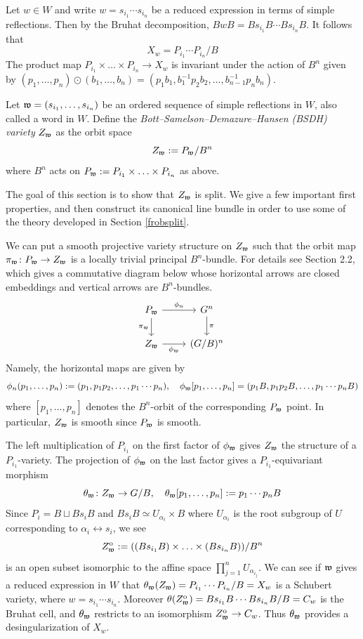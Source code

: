 \documentclass[12pt]{article}
\begin{document}
Let $w \in W$ and write $w = s_{i_1}\cdots s_{i_n}$ be a reduced expression in terms of simple reflections. Then by the Bruhat decomposition, $BwB = Bs_{i_1}B\cdots Bs_{i_n}B$. It follows that
\[X_w = P_{i_1}\cdots P_{i_n}/B\]
The product map $P_{i_1} \times \ldots \times P_{i_n} \to X_w$ is invariant under the action of $B^n$ given by $(p_1,\ldots,p_n) \odot (b_1,\ldots,b_n) = (p_1 b_1, b_1^{-1} p_2 b_2, \ldots, b_{n-1}^{-1} p_n b_n)$.
\begin{defn}
    Let $\mathfrak{w} = (s_{i_1},\ldots,s_{i_n})$ be an ordered sequence of simple reflections in $W$, also called a word in $W$. Define the \textit{Bott–Samelson–Demazure–Hansen (BSDH) variety} $Z_{\mathfrak{w}}$ as the orbit space
    \[Z_{\mathfrak{w}} := P_{\mathfrak{w}}/B^n\]
    where $B^n$ acts on $P_{\mathfrak{w}} := P_{i_1} \times \ldots \times P_{i_n}$ as above.
\end{defn}
The goal of this section is to show that $Z_{\mathfrak{w}}$ is split. We give a few important first properties, and then construct its canonical line bundle in order to use some of the theory developed in Section \ref{frobsplit}.

We can put a smooth projective variety structure on $Z_{\mathfrak{w}}$ such that the orbit map $\pi_{\mathfrak{w}} \colon P_{\mathfrak{w}} \to Z_{\mathfrak{w}}$ is a locally trivial principal $B^n$-bundle. For details see \cite{Brion2004} Section 2.2, which gives a commutative diagram below whose horizontal arrows are closed embeddings and vertical arrows are $B^n$-bundles.
\[\begin{tikzcd}
	{P_{\mathfrak{w}}} & {G^n} \\
	{Z_{\mathfrak{w}}} & {(G/B)^n}
	\arrow["{\phi_n}", from=1-1, to=1-2]
	\arrow["{\pi_{\mathfrak{w}}}"', from=1-1, to=2-1]
	\arrow["\pi", from=1-2, to=2-2]
	\arrow["{\phi_{\mathfrak{w}}}"', from=2-1, to=2-2]
\end{tikzcd}\]
Namely, the horizontal maps are given by
\[\phi_n(p_1,\ldots,p_n) := (p_1,p_1p_2,\ldots,p_1\cdots p_n), \quad \phi_{\mathfrak{w}}[p_1,\ldots,p_n]=(p_1B, p_1p_2B, \ldots, p_1\cdots p_n B)\]
where $[p_1,\ldots,p_n]$ denotes the $B^n$-orbit of the corresponding $P_{\mathfrak{w}}$ point. In particular, $Z_{\mathfrak{w}}$ is smooth since $P_{\mathfrak{w}}$ is smooth.

The left multiplication of $P_{i_1}$ on the first factor of $\phi_{\mathfrak{w}}$ gives $Z_{\mathfrak{w}}$ the structure of a $P_{i_1}$-variety. The projection of $\phi_{\mathfrak{w}}$ on the last factor gives a $P_{i_1}$-equivariant morphism 
\[\theta_{\mathfrak{w}} \colon Z_{\mathfrak{w}} \rightarrow G/B, \quad \theta_{\mathfrak{w}}[p_1,\ldots,p_n] := p_1\cdots p_n B\]
Since $P_i = B \sqcup Bs_i B$ and $Bs_i B \simeq U_{\alpha_i} \times B$ where $U_{\alpha_i}$ is the root subgroup of $U$ corresponding to $\alpha_i \leftrightarrow s_i$, we see
\[Z^{\mathrm{o}}_{\mathfrak{w}} := ((Bs_{i_1}B) \times \ldots \times (B s_{i_n} B))/B^n\]
is an open subset isomorphic to the affine space $\prod_{j=1}^n U_{\alpha_{i_j}}$. We can see if $\mathfrak{w}$ gives a reduced expression in $W$ that $\theta_{\mathfrak{w}}(Z_{\mathfrak{w}}) = P_{i_1}\cdots P_{i_n}/B = X_w$ is a Schubert variety, where $w= s_{i_1}\cdots s_{i_n}$. Moreover $\theta(Z^{\mathrm{o}}_{\mathfrak{w}}) = Bs_{i_1}B\cdots Bs_{i_n} B/B = C_w$ is the Bruhat cell, and $\theta_{\mathfrak{w}}$ restricts to an isomorphism $Z^{\mathrm{o}}_{\mathfrak{w}} \to C_w$. Thus $\theta_{\mathfrak{w}}$ provides a desingularization of $X_w$.
\end{document}
